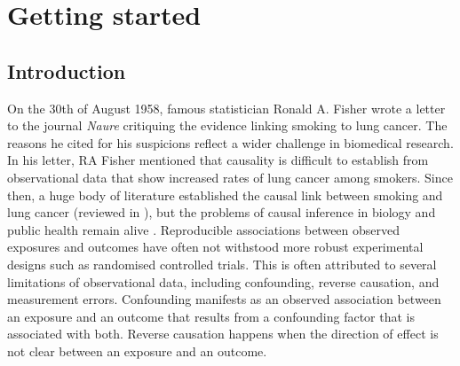 
\chapter{Getting started}  %

\ifpdf
    \graphicspath{{Chapter1/Figs/Raster/}{Chapter1/Figs/PDF/}{Chapter1/Figs/}}
\else
    \graphicspath{{Chapter1/Figs/Vector/}{Chapter1/Figs/}}
\fi


\section{Introduction} 
On the 30th of August 1958, famous statistician Ronald A. Fisher wrote a letter to the journal \textit{Naure} critiquing the evidence linking smoking to lung cancer. The reasons he cited for his suspicions reflect a wider challenge in biomedical research. In his letter, RA Fisher mentioned that causality is difficult to establish from observational data that show increased rates of lung cancer among smokers. Since then, a huge body of literature established the causal link between smoking and lung cancer (reviewed in \cite{Malone2012-na}), but the problems of causal inference in biology and public health remain alive \cite{Glass2013-up}. Reproducible associations between observed exposures and outcomes have often not withstood more robust experimental designs such as randomised controlled trials. This is often attributed to several limitations of observational data, including confounding, reverse causation, and measurement errors. Confounding manifests as an observed association between an exposure and an outcome that results from a confounding factor that is associated with both. Reverse causation happens when the direction of effect is not clear between an exposure and an outcome.\\

